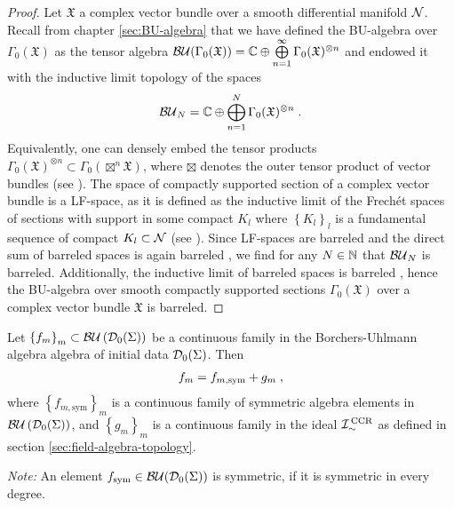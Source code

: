\begin{proof}
	Let $\mathfrak{X}$ a complex vector bundle over a smooth differential manifold $\mathcal{N}$. Recall from chapter \ref{sec:BU-algebra} that we have defined the BU-algebra over $\Gamma_0(\mathfrak{X})$ as the tensor algebra $\mathcal{BU}(\Gamma_0(\mathfrak{X})) = \mathbb{C} \oplus \bigoplus\limits_{n= 1}^\infty \Gamma_0(\mathfrak{X})^{\otimes n}$ and endowed it with the inductive limit topology of the spaces
\begin{align}
\mathcal{BU}_N = \mathbb{C} \oplus \bigoplus\limits_{n= 1}^N \Gamma_0(\mathfrak{X})^{\otimes n} \;.
\end{align}
	 Equivalently, one can densely embed the tensor products $\Gamma_0(\mathfrak{X})^{\otimes n} \subset \Gamma_0( \boxtimes^n \mathfrak{X} )$, where $\boxtimes$ denotes the outer tensor product of vector bundles (see \cite[Chapter 3.3]{verch_sahlman}). The space of compactly supported section of a complex vector bundle is a LF-space, as it is defined as the inductive limit of the Frech\'et spaces of sections with support in some compact $K_l$ where $\left\{ K_l \right\}_l$ is a fundamental sequence of compact $K_l \subset \mathcal{N}$ (see \cite[17.2.2 and 17.3.1]{dieudonne_3}). Since LF-spaces are barreled \cite[Chapter 33, Corollary 3]{treves} and the direct sum of barreled spaces is again barreled \cite[18.11]{kelly-namioka}, we find for any $N \in \mathbb{N}$ that $\mathcal{BU}_N$ is barreled. Additionally, the inductive limit of barreled spaces is barreled \cite[Chapter V, Proposition 6]{robertson}, hence the BU-algebra over smooth compactly supported sections $\Gamma_0(\mathfrak{X})$ over a complex vector bundle $\mathfrak{X}$ is barreled.
\end{proof}
%
%
%
\begin{lemma} \label{lem:symmetrization-of-fields}
	Let $\left\{f_m\right\}_m \subset \mathcal{BU}\left(\mathcal{D}_{0}(\Sigma) \right)$ be a continuous family in the Borchers-Uhlmann algebra algebra of initial data $\mathcal{D}_{0}(\Sigma)$.
	Then
	\begin{align}
		f_m = f_{m,\text{sym}} + g_m \;,
	\end{align}
	where $\left\{f_{m,\text{sym}}\right\}_m$ is a continuous family of symmetric algebra elements in $\mathcal{BU}\left(\mathcal{D}_{0}(\Sigma) \right)$, and $\left\{ g_m\right\}_m$ is a continuous family in the ideal ${\mathcal{I}}_{\sim}^\text{\,CCR}$ as defined in section \ref{sec:field-algebra-topology}.
\end{lemma}
\emph{Note:} An element $f_{\text{sym}} \in \mathcal{BU}(\mathcal{D}_{0}(\Sigma))$ is symmetric, if it is symmetric in every degree.
